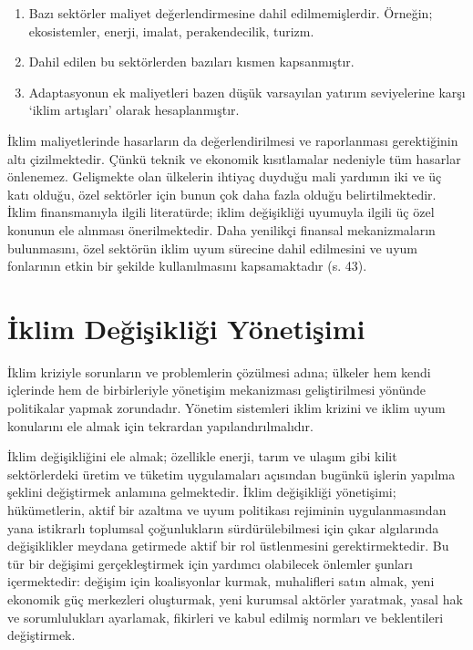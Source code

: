 \documentclass[
]{book}
\begin{document}
\begin{enumerate}
\def\labelenumi{\arabic{enumi})}
\item
  Bazı sektörler maliyet değerlendirmesine dahil edilmemişlerdir. Örneğin; ekosistemler, enerji, imalat, perakendecilik, turizm.
\item
  Dahil edilen bu sektörlerden bazıları kısmen kapsanmıştır.
\item
  Adaptasyonun ek maliyetleri bazen düşük varsayılan yatırım seviyelerine karşı `iklim artışları' olarak hesaplanmıştır.
\end{enumerate}

İklim maliyetlerinde hasarların da değerlendirilmesi ve raporlanması gerektiğinin altı çizilmektedir. Çünkü teknik ve ekonomik kısıtlamalar nedeniyle tüm hasarlar önlenemez. Gelişmekte olan ülkelerin ihtiyaç duyduğu mali yardımın iki ve üç katı olduğu, özel sektörler için bunun çok daha fazla olduğu belirtilmektedir. \citep{parry2009assessing} İklim finansmanıyla ilgili literatürde; iklim değişikliği uyumuyla ilgili üç özel konunun ele alınması önerilmektedir. Daha yenilikçi finansal mekanizmaların bulunmasını, özel sektörün iklim uyum sürecine dahil edilmesini ve uyum fonlarının etkin bir şekilde kullanılmasını kapsamaktadır (s. 43). \citep{roy2018evaluating}

\hypertarget{iklim-deux11fiux15fikliux11fi-yuxf6netiux15fimi}{%
\section{İklim Değişikliği Yönetişimi}\label{iklim-deux11fiux15fikliux11fi-yuxf6netiux15fimi}}

İklim kriziyle sorunların ve problemlerin çözülmesi adına; ülkeler hem kendi içlerinde hem de birbirleriyle yönetişim mekanizması geliştirilmesi yönünde politikalar yapmak zorundadır. Yönetim sistemleri iklim krizini ve iklim uyum konularını ele almak için tekrardan yapılandırılmalıdır.

İklim değişikliğini ele almak; özellikle enerji, tarım ve ulaşım gibi kilit sektörlerdeki üretim ve tüketim uygulamaları açısından bugünkü işlerin yapılma şeklini değiştirmek anlamına gelmektedir. İklim değişikliği yönetişimi; hükümetlerin, aktif bir azaltma ve uyum politikası rejiminin uygulanmasından yana istikrarlı toplumsal çoğunlukların sürdürülebilmesi için çıkar algılarında değişiklikler meydana getirmede aktif bir rol üstlenmesini gerektirmektedir. Bu tür bir değişimi gerçekleştirmek için yardımcı olabilecek önlemler şunları içermektedir: değişim için koalisyonlar kurmak, muhalifleri satın almak, yeni ekonomik güç merkezleri oluşturmak, yeni kurumsal aktörler yaratmak, yasal hak ve sorumlulukları ayarlamak, fikirleri ve kabul edilmiş normları ve beklentileri değiştirmek. \citep{meadowcroft2009climate}
\end{document}
